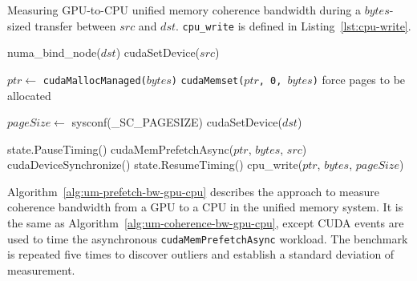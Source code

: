 \begin{algorithm}[H]
	\caption[Measuring GPU-to-CPU Unified Memory Coherence Bandwidth.]{
		Measuring GPU-to-CPU unified memory coherence bandwidth during a $bytes$-sized transfer between $src$ and $dst$.
		\texttt{cpu\_write} is defined in Listing~\ref{lst:cpu-write}.
	}
	\label{alg:um-coherence-bw-gpu-cpu}
	\begin{algorithmic}[1]
		\Statex
		
		\State numa\_bind\_node($dst$)
		\State cudaSetDevice($src$)

		\State $ptr \gets$ \texttt{cudaMallocManaged($bytes$)}
		\State \texttt{cudaMemset($ptr$, 0, $bytes$)} \Comment force pages to be allocated

		\State $pageSize \gets$ sysconf(\_SC\_PAGESIZE)
		\State cudaSetDevice($dst$)        
				
			\State state.PauseTiming()
			\State cudaMemPrefetchAsync($ptr$, $bytes$, $src$)
			\State cudaDeviceSynchronize()
			\State state.ResumeTiming()
			\State cpu\_write($ptr$, $bytes$, $pageSize$)
		\EndFor
		\EndFunction			
	\end{algorithmic}
\end{algorithm}

Algorithm~\ref{alg:um-prefetch-bw-gpu-cpu} describes the approach to measure coherence bandwidth from a GPU to a CPU in the unified memory system.
It is the same as Algorithm~\ref{alg:um-coherence-bw-gpu-cpu}, except CUDA events are used to time the asynchronous \texttt{cudaMemPrefetchAsync} workload.
The benchmark is repeated five times to discover outliers and establish a standard deviation of measurement.

